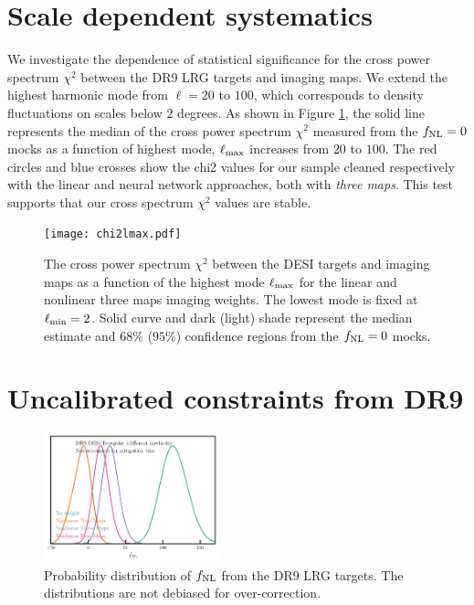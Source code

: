 \section{Scale dependent systematics}\label{sec:scalesys}
We investigate the dependence of statistical significance for the cross power spectrum $\chi^{2}$ between the DR9 LRG targets and imaging maps. We extend the highest harmonic mode from $\ell=20$ to $100$, which corresponds to density fluctuations on scales below $2$ degrees. As shown in Figure \ref{fig:chi2cellextend}, the solid line represents the median of the cross power spectrum $\chi^{2}$ measured from the $f_{\rm NL}=0$ mocks as a function of highest mode, $\ell_{\rm max}$ increases from $20$ to $100$. The red circles and blue crosses show the chi2 values for our sample cleaned respectively with the linear and neural network approaches, both with \textit{three maps}.  This test supports that our cross spectrum $\chi^{2}$ values are stable. 

\begin{figure}
\centering
\texttt{[image: chi2lmax.pdf]}
\caption{The cross power spectrum $\chi^{2}$ between the DESI targets and imaging maps as a function of the highest mode $\ell_{\rm max}$ for the linear and nonlinear three maps imaging weights. The lowest mode is fixed at $\ell_{\rm min}=2$. Solid curve and dark (light) shade represent the median estimate and $68\%$ ($95\%$) confidence regions from the $f_{\rm NL}=0$ mocks.}\label{fig:chi2cellextend}
\end{figure}


\section{Uncalibrated constraints from DR9}\label{sec:dr9uncalib}

\begin{figure}
    \centering
    \includegraphics[width=0.45\textwidth]{figures/mcmc_dr9methods1dnoshift.pdf}
    \caption{Probability distribution of $f_{\rm NL}$ from the DR9 LRG targets. The distributions are not debiased for over-correction.}
    \label{fig:mcmcdr9noshift}
\end{figure}


